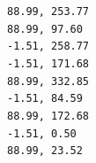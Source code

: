 \documentclass[9pt, aspectratio=169]{beamer}
\begin{document}
\begin{frame}
{\begin{columns}
\begin{column}{.7\textwidth}
            \end{column}
            \begin{column}{.23\textwidth}
                \begin{codebox}
                    \texttt{88.99, 253.77\\
                        88.99, 97.60\\
                        -1.51, 258.77\\
                        -1.51, 171.68\\
                        88.99, 332.85\\
                        -1.51, 84.59\\
                        88.99, 172.68\\
                        -1.51, 0.50\\
                        88.99, 23.52
                    }
                \end{codebox}
            \end{column}
        \end{columns}

    }
\end{frame}
\end{document}
